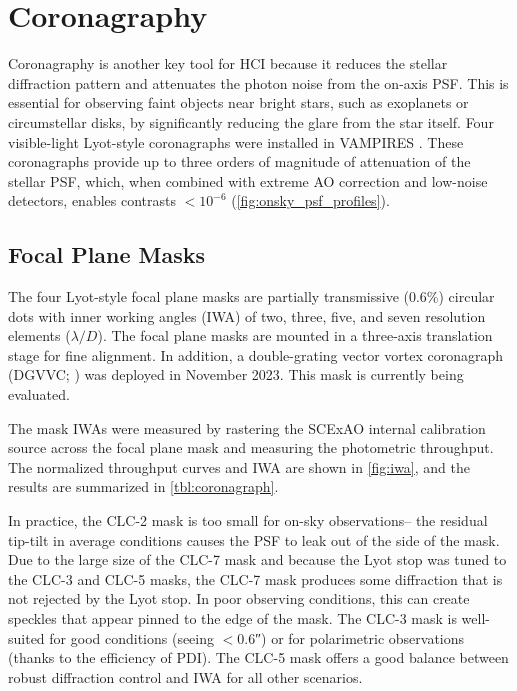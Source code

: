 \section{Coronagraphy}\label{sec:coronagraphy}

Coronagraphy is another key tool for HCI because it reduces the stellar diffraction pattern and attenuates the photon noise from the on-axis PSF. This is essential for observing faint objects near bright stars, such as exoplanets or circumstellar disks, by significantly reducing the glare from the star itself. Four visible-light Lyot-style coronagraphs were installed in VAMPIRES \citep{lucas_visible-light_2022}. These coronagraphs provide up to three orders of magnitude of attenuation of the stellar PSF, which, when combined with extreme AO correction and low-noise detectors, enables contrasts $<10^{-6}$ (\autoref{fig:onsky_psf_profiles}).

\subsection{Focal Plane Masks}

The four Lyot-style focal plane masks are partially transmissive (0.6\%) circular dots with inner working angles (IWA) of two, three, five, and seven resolution elements ($\lambda/D$). The focal plane masks are mounted in a three-axis translation stage for fine alignment. In addition, a double-grating vector vortex coronagraph (DGVVC; \citealp{doelman_falco_2023}) was deployed in November 2023. This mask is currently being evaluated.

The mask IWAs were measured by rastering the SCExAO internal calibration source across the focal plane mask and measuring the photometric throughput. The normalized throughput curves and IWA are shown in \autoref{fig:iwa}, and the results are summarized in \autoref{tbl:coronagraph}.

In practice, the CLC-2 mask is too small for on-sky observations-- the residual tip-tilt in average conditions causes the PSF to leak out of the side of the mask. Due to the large size of the CLC-7 mask and because the Lyot stop was tuned to the CLC-3 and CLC-5 masks, the CLC-7 mask produces some diffraction that is not rejected by the Lyot stop. In poor observing conditions, this can create speckles that appear pinned to the edge of the mask. The CLC-3 mask is well-suited for good conditions (seeing $<$\ang{;;0.6}) or for polarimetric observations (thanks to the efficiency of PDI). The CLC-5 mask offers a good balance between robust diffraction control and IWA for all other scenarios.

